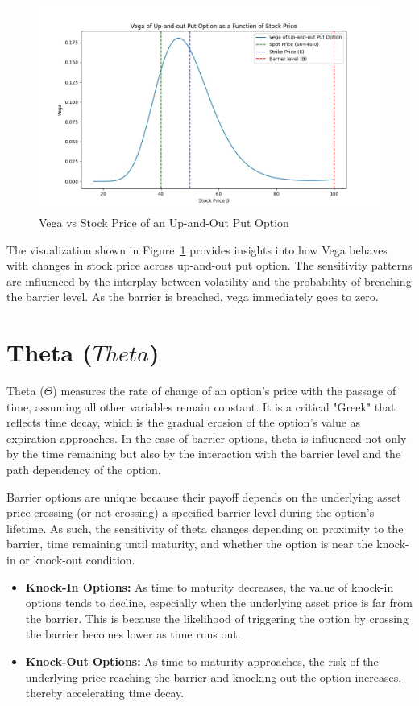 \begin{figure}[H]
	\centering
	\includegraphics[width=.65\linewidth]{content/images/vega_upout.png}
	\caption{Vega vs Stock Price of an Up-and-Out Put Option}
	\label{fig:vega_behavior}
\end{figure}

The visualization shown in Figure~\ref{fig:vega_behavior} provides insights into how Vega behaves with changes in stock price across up-and-out put option. The sensitivity patterns are influenced by the interplay between volatility and the probability of breaching the barrier level. As the barrier is breached, vega immediately goes to zero.

\section{Theta ($Theta$)}

Theta (\(\Theta\)) measures the rate of change of an option's price with the passage of time, assuming all other variables remain constant. It is a critical "Greek" that reflects time decay, which is the gradual erosion of the option's value as expiration approaches. In the case of barrier options, theta is influenced not only by the time remaining but also by the interaction with the barrier level and the path dependency of the option.

Barrier options are unique because their payoff depends on the underlying asset price crossing (or not crossing) a specified barrier level during the option's lifetime. As such, the sensitivity of theta changes depending on proximity to the barrier, time remaining until maturity, and whether the option is near the knock-in or knock-out condition.

\begin{itemize}
	\item \textbf{Knock-In Options:} As time to maturity decreases, the value of knock-in options tends to decline, especially when the underlying asset price is far from the barrier. This is because the likelihood of triggering the option by crossing the barrier becomes lower as time runs out.
	
	\item \textbf{Knock-Out Options:} As time to maturity approaches, the risk of the underlying price reaching the barrier and knocking out the option increases, thereby accelerating time decay.
\end{itemize}


